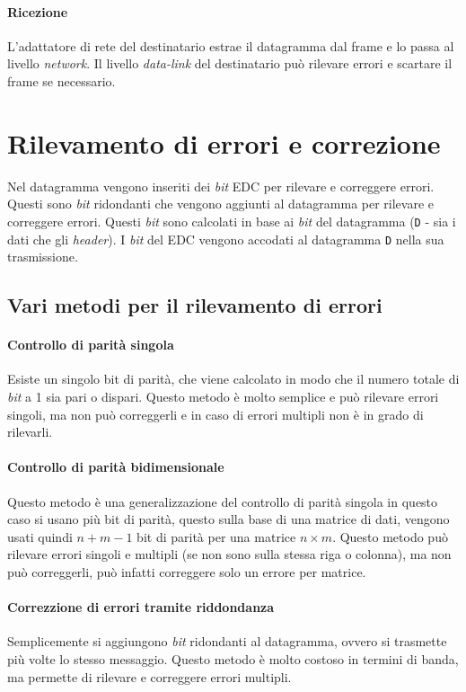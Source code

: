         \paragraph{Ricezione} L'adattatore di rete del destinatario estrae il datagramma dal frame e lo passa al livello \textit{network}. Il livello \textit{data-link} del destinatario può rilevare errori e scartare il frame se necessario.
\section{Rilevamento di errori e correzione}
    Nel datagramma vengono inseriti dei \textit{bit} \acrfull*{EDC} per rilevare e correggere errori. Questi sono \textit{bit} ridondanti che vengono aggiunti al datagramma per rilevare e correggere errori. Questi \textit{bit} sono calcolati in base ai \textit{bit} del datagramma (\texttt{D} - sia i dati che gli \textit{header}). I \textit{bit} del \Acrshort*{EDC} vengono accodati al datagramma \texttt{D} nella sua trasmissione.

    \subsection{Vari metodi per il rilevamento di errori}
        \paragraph{Controllo di parità singola} Esiste un singolo bit di parità, che viene calcolato in modo che il numero totale di \textit{bit} a 1 sia pari o dispari. Questo metodo è molto semplice e può rilevare errori singoli, ma non può correggerli e in caso di errori multipli non è in grado di rilevarli.
        \paragraph{Controllo di parità bidimensionale} Questo metodo è una generalizzazione del controllo di parità singola in questo caso si usano più bit di parità, questo sulla base di una matrice di dati, vengono usati quindi $n+m-1$ bit di parità per una matrice $n \times m$. Questo metodo può rilevare errori singoli e multipli (se non sono sulla stessa riga o colonna), ma non può correggerli, può infatti correggere solo un errore per matrice.
        \paragraph{Correzzione di errori tramite riddondanza} Semplicemente si aggiungono \textit{bit} ridondanti al datagramma, ovvero si trasmette più volte lo stesso messaggio. Questo metodo è molto costoso in termini di banda, ma permette di rilevare e correggere errori multipli.
    
